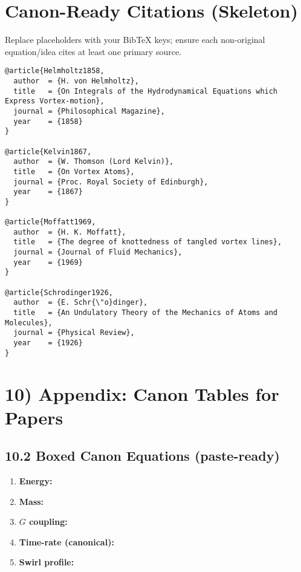 \documentclass[11pt, a4paper]{article}
\begin{document}
\section{Canon-Ready Citations (Skeleton)}

Replace placeholders with your BibTeX keys; ensure each non-original equation/idea cites at least one primary source.

\begin{verbatim}
@article{Helmholtz1858,
  author  = {H. von Helmholtz},
  title   = {On Integrals of the Hydrodynamical Equations which Express Vortex-motion},
  journal = {Philosophical Magazine},
  year    = {1858}
}

@article{Kelvin1867,
  author  = {W. Thomson (Lord Kelvin)},
  title   = {On Vortex Atoms},
  journal = {Proc. Royal Society of Edinburgh},
  year    = {1867}
}

@article{Moffatt1969,
  author  = {H. K. Moffatt},
  title   = {The degree of knottedness of tangled vortex lines},
  journal = {Journal of Fluid Mechanics},
  year    = {1969}
}

@article{Schrodinger1926,
  author  = {E. Schr{\"o}dinger},
  title   = {An Undulatory Theory of the Mechanics of Atoms and Molecules},
  journal = {Physical Review},
  year    = {1926}
}
\end{verbatim}

\section*{10) Appendix: Canon Tables for Papers}


\subsection*{10.2 Boxed Canon Equations (paste-ready)}

\begin{enumerate}
    \item \textbf{Energy:} 
    \item \textbf{Mass:} 
    \item \textbf{$G$ coupling:} 
    \item \textbf{Time-rate (canonical):} 
    \item \textbf{Swirl profile:} 
\end{enumerate}
\end{document}
